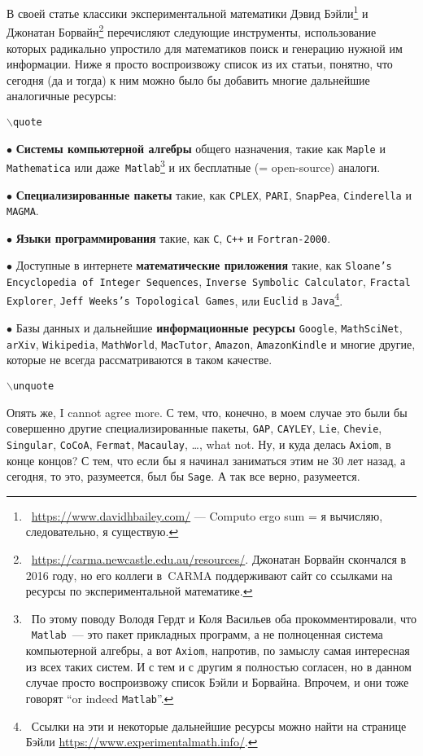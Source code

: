 \documentclass[intlimits,twoside,a4paper,11pt]{article}
\begin{document}
		В своей статье \cite{BB11} классики экспериментальной математики
		Дэвид Бэйли\footnote{~\url{https://www.davidhbailey.com/} ---  Computo ergo sum =
			я вычисляю, следовательно, я существую.}
		и Джонатан Борвайн\footnote{~\url{https://carma.newcastle.edu.au/resources/}. 
			Джонатан Борвайн скончался в 2016 году, но его коллеги в~CARMA поддерживают сайт
			со ссылками на ресурсы по экспериментальной математике.} 
		перечисляют следующие инструменты,
		использование которых радикально упростило для математиков
		поиск и генерацию нужной им информации. Ниже я просто воспроизвожу
		список из их статьи, понятно, что сегодня (да и тогда) к ним можно 
		было бы добавить многие дальнейшие аналогичные ресурсы:
		\par\smallskip\noindent
		{\tt $\backslash$quote}
		\par
		$\bullet$ {\bf Системы компьютерной алгебры} общего назначения,
		такие как {\tt Maple} и {\tt Mathematica} или даже \,{\tt Matlab}\footnote{~По этому
			поводу Володя Гердт и Коля Васильев оба прокомментировали, что \, {\tt Matlab}\, --- это
			пакет прикладных программ, а не полноценная система компьютерной алгебры, 
			а вот {\tt Axiom}, напротив, по замыслу самая интересная из всех таких систем. 
			И с тем и с другим я полностью согласен, но в данном случае просто
			воспроизвожу список Бэйли и Борвайна. Впрочем, и они тоже говорят ``or indeed 
			{\tt Matlab}''.} 
		и их бесплатные (= open-source) аналоги.
		\par\smallskip
		$\bullet$ {\bf Специализированные пакеты} такие, как {\tt CPLEX}, {\tt PARI},
		{\tt SnapPea}, {\tt Cinderella} и {\tt MAGMA}.
		\par\smallskip
		$\bullet$ {\bf Языки программирования} такие, как {\tt C}, {\tt C++} и 
		{\tt Fortran-2000}.
		\par\smallskip
		$\bullet$ Доступные в интернете {\bf математические приложения} такие, как 
		{\tt Sloane’s
			En\-cy\-clo\-pedia of Integer Sequences}, {\tt Inverse
			Symbolic Calculator}, {\tt Fractal Explo\-rer},
		{\tt Jeff Weeks’s Topological Games}, или {\tt Euclid}
		в {\tt Java}\footnote{~Ссылки на эти и некоторые дальнейшие ресурсы можно найти 
			на странице Бэйли \url{https://www.experimentalmath.info/}.}. 
		\par\smallskip
		$\bullet$ Базы данных и дальнейшие {\bf информационные ресурсы}
		{\tt Google}, {\tt MathSciNet}, {\tt arXiv}, {\tt Wikipedia}, {\tt MathWorld}, 
		{\tt MacTutor}, {\tt Amazon}, {\tt AmazonKindle} и многие другие,
		которые не всегда рассматриваются в таком качестве.
		\par\noindent
		{\tt $\backslash$unquote}
		\par\smallskip
		Опять же, I cannot agree more. С тем, что, конечно, в моем случае
		это были бы совершенно другие специализированные пакеты, {\tt GAP},
		{\tt CAYLEY}, {\tt Lie}, {\tt Chevie}, {\tt Singular}, {\tt CoCoA},
		{\tt Fermat}, {\tt Macaulay}, \ldots, what not. Ну, и куда делась
		{\tt Axiom}, в конце концов? С тем, что если бы я начинал заниматься 
		этим не 30 лет назад, а сегодня, то это, разумеется, был бы {\tt Sage}. 
		А так все верно, разумеется.
		
\end{document}
